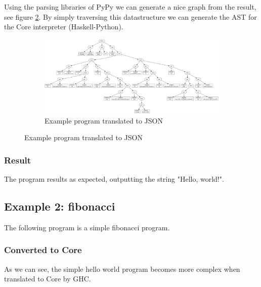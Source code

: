 Using the parsing libraries of PyPy we can generate a nice graph from the result, 
see figure \ref{fig:helloworldgraph}.
By simply traversing this datastructure we can generate the AST for the Core 
interpreter (Haskell-Python).

\begin{figure}
\begin{figure}[H]
\includegraphics[width=\textwidth]{../interpreter/tests/helloworld.png}
\caption{Example program translated to JSON}
\label{fig:helloworldgraph}
\end{figure}
\end{figure}

\subsubsection{Result}

The program results as expected, outputting the string "Hello, world!".

\subsection{Example 2: fibonacci}

The following program is a simple fibonacci program.

\begin{footnotesize}

\end{footnotesize}

\subsubsection{Converted to Core}

As we can see, the simple hello world program becomes more complex when translated
to Core by GHC.

\begin{footnotesize}

\end{footnotesize}

